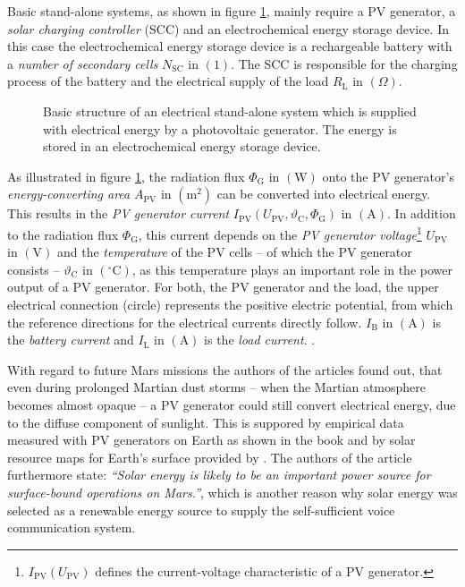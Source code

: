 Basic stand-alone systems, as shown in figure \ref{fig:tikz/tikz_solar_energy_distribution}, mainly require a PV generator, a \emph{solar charging controller} (SCC) and an electrochemical energy storage device. In this case the electrochemical energy storage device is a rechargeable battery with a \emph{number of secondary cells} $N_\mathrm{SC}$ in $\left( 1 \right)$. The SCC is responsible for the charging process of the battery and the electrical supply of the load $R_\mathrm{L}$ in $\left( \Omega \right)$.
\begin{figure}[h!]
	\centering
	
	\caption{Basic structure of an electrical stand-alone system which is supplied with electrical energy by a photovoltaic generator. The energy is stored in an electrochemical energy storage device.}
	\label{fig:tikz/tikz_solar_energy_distribution}
\end{figure}
As illustrated in figure \ref{fig:tikz/tikz_solar_energy_distribution}, the radiation flux $\Phi_{\mathrm{G}}$ in $\left( \mathrm{W} \right)$ onto the PV generator's \emph{energy-converting area} $A_{\mathrm{PV}}$ in $\left( \mathrm{m}^2 \right)$ can be converted into electrical energy. This results in the \emph{PV generator current} $I_{\mathrm{PV}}\left( U_{\mathrm{PV}}, \vartheta_\mathrm{C}, \Phi_\mathrm{G} \right)$ in $\left( \mathrm{A} \right)$. In addition to the radiation flux $\Phi_\mathrm{G}$, this current depends on the \emph{PV generator voltage}\footnote{$I_{\mathrm{PV}}\left( U_{\mathrm{PV}} \right)$ defines the current-voltage characteristic of a PV generator.} $U_{\mathrm{PV}}$ in $\left( \mathrm{V} \right)$ and the \emph{temperature} of the PV cells -- of which the PV generator consists -- $\vartheta_{\mathrm{C}}$ in $\left( ^\circ \mathrm{C} \right)$, as this temperature plays an important role in the power output of a PV generator. For both, the PV generator and the load, the upper electrical connection (circle) represents the positive electric potential, from which the reference directions for the electrical currents directly follow. $I_\mathrm{B}$ in $\left( \mathrm{A}\right)$ is the \emph{battery current} and $I_\mathrm{L}$ in $\left( \mathrm{A}\right)$ is the \emph{load current}. \cite{Ley:2011, Bertol:2011, Mertens:2015}.

With regard to future Mars missions the authors of the articles \cite{Appelbaum:1990, Appelbaum:1992, Landis:1995} found out, that even during prolonged Martian dust storms -- when the Martian atmosphere becomes almost opaque -- a PV generator could still convert electrical energy, due to the diffuse component of sunlight. This is suppored by empirical data measured with PV generators on Earth as shown in the book \cite{Mertens:2015} and by solar resource maps for Earth's surface provided by \cite{SolargisMaps:2020, GlobalSolarAtlas:2020, Union:2020}. The authors of the article \cite[1]{Landis:1995} furthermore state: \textit{``Solar energy is likely to be an important power source for surface-bound operations on Mars.''}, which is another reason why solar energy was selected as a renewable energy source to supply the self-sufficient voice communication system.

